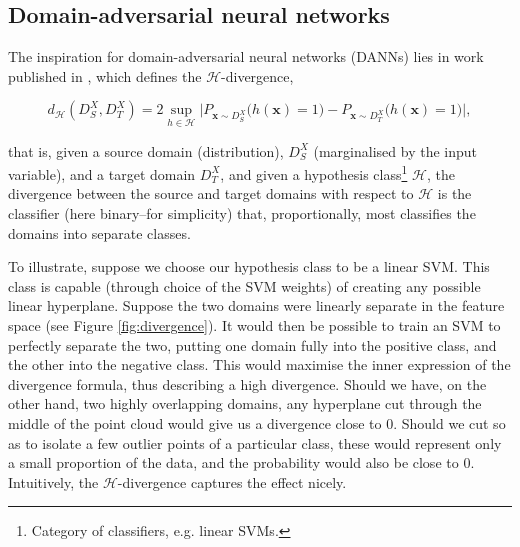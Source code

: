 \subsection{Domain-adversarial neural networks}
\label{subsubsec:adversarial_notes}


The inspiration for domain-adversarial neural networks (DANNs) lies in work published in \cite{ben2010theory}, which defines the $\mathcal{H}$-divergence,

\begin{equation}
d_\mathcal{H}(D_S^X, D_T^X) = 2\sup_{h \in \mathcal{H}}\Big|P_{\mathbf{x} \sim D_S^X}\big(h(\mathbf{x})= 1\big) - P_{\mathbf{x} \sim D_T^X}\big(h(\mathbf{x}) = 1\big)\Big|,
\end{equation}

that is, given a source domain (distribution), $D_S^X$ (marginalised by the input variable), and a target domain $D_T^X$, and given a hypothesis class\footnote{Category of classifiers, e.g. linear SVMs.} $\mathcal{H}$, the divergence between the source and target domains with respect to $\mathcal{H}$ is the classifier (here binary--for simplicity) that, proportionally, most classifies the domains into separate classes.

To illustrate, suppose we choose our hypothesis class to be a linear SVM. This class is capable (through choice of the SVM weights) of creating any possible linear hyperplane. Suppose the two domains were linearly separate in the feature space (see Figure \ref{fig:divergence}). It would then be possible to train an SVM to perfectly separate the two, putting one domain fully into the positive class, and the other into the negative class. This would maximise the inner expression of the divergence formula, thus describing a high divergence. Should we have, on the other hand, two highly overlapping domains, any hyperplane cut through the middle of the point cloud would give us a divergence close to 0. Should we cut so as to isolate a few outlier points of a particular class, these would represent only a small proportion of the data, and the probability would also be close to 0. Intuitively, the $\mathcal{H}$-divergence captures the effect nicely.

